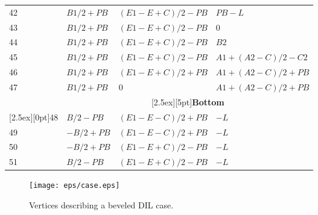 \documentclass[a4paper, dvipdfm]{article}
\begin{document}
\begin{longtable}{|l|l|l|l|}
42 & $B1/2+PB$  & $(E1-E+C)/2-PB$    & $PB-L$\\
43 & $B1/2+PB$  & $(E1-E+C)/2-PB$    & $0$\\
44 & $B1/2+PB$  & $(E1-E+C)/2-PB$    & $B2$\\
45 & $B1/2+PB$  & $(E1-E+C)/2-PB$    & $A1+(A2-C)/2-C2$\\
46 & $B1/2+PB$  & $(E1-E+C)/2+PB$    & $A1+(A2-C)/2+PB$\\
47 & $B1/2+PB$  & $0$                & $A1+(A2-C)/2+PB$\\
\cline{2-4}
&\multicolumn{3}{|c|}{\raisebox{0pt}[2.5ex][5pt]{\textbf{Bottom}}}\\\cline{2-4}
\raisebox{0pt}[2.5ex][0pt]{48}
   & $B/2-PB$  & $(E1-E-C)/2+PB$     & $-L$\\
49 & $-B/2+PB$ & $(E1-E-C)/2+PB$     & $-L$\\
50 & $-B/2+PB$ & $(E1-E+C)/2-PB$     & $-L$\\
51 & $B/2-PB$  & $(E1-E+C)/2-PB$     & $-L$\\
\hline
\end{longtable}


\begin{figure}
\begin{center}
\texttt{[image: eps/case.eps]}
\end{center}
\caption{Vertices describing a beveled DIL case.}
\label{fig:dilcase}
\end{figure}
\end{document}
